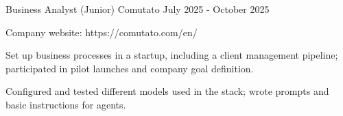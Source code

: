 

\begin{cventries}


  \cventry
    {Business Analyst (Junior)} %
    {Comutato} %
    {} %
    {July 2025 - October 2025} %
    {
      \begin{cvitems} %
        \item {Company website: https://comutato.com/en/}
        \item {Set up business processes in a startup, including a client management pipeline; participated in pilot launches and company goal definition.}
        \item {Configured and tested different models used in the stack; wrote prompts and basic instructions for agents.}
      \end{cvitems}
    }
\end{cventries}
